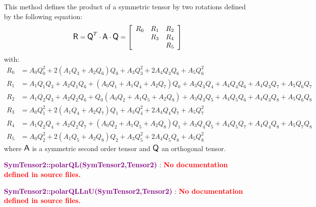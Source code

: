 This method defines the product of a symmetric tensor by two rotations defined by the following equation:
\begin{equation*}
\mbox{\large\ensuremath{\mathsf{R}}} = \mbox{\large\ensuremath{\mathsf{Q}}}^T \cdot \mbox{\large\ensuremath{\mathsf{A}}} \cdot \mbox{\large\ensuremath{\mathsf{Q}}} =\left[\begin{array}{ccc}
R_0&R_1&R_2\\
&R_3&R_4\\
&&R_5
\end{array}\right]
\end{equation*}
with:
\begin{align*}
R_0 &= A_0 Q_0^2 + 2 (A_1 Q_3 + A_2 Q_6) Q_0 + A_3 Q_3^2 + 2 A_4 Q_3 Q_6 + A_5 Q_6^2 \\
R_1 &= A_1 Q_1 Q_3 +A_2 Q_1 Q_6 + (A_0 Q_1 + A_1 Q_4 + A_2 Q_7) Q_0+ A_3 Q_3 Q_4 + A_4 Q_4 Q_6 + A_4 Q_3 Q_7 + A_5 Q_6 Q_7\\
R_2 &= A_1 Q_2 Q_3 + A_2 Q_2 Q_6 + Q_0 (A_0 Q_2 + A_1 Q_5 + A_2 Q_8) + A_3 Q_3 Q_5 + A_4 Q_5 Q_6 + A_4 Q_3 Q_8 + A_5 Q_6 Q_8\\
R_3 &= A_0 Q_1^2 + 2 (A_1 Q_4 + A_2 Q_7)Q_1 + A_3 Q_4^2 + 2 A_4 Q_4 Q_7 + A_5 Q_7^2\\
R_4 &= A_1 Q_2 Q_4 + A_2 Q_2 Q_7 + (A_0 Q_2 + A_1 Q_5 + A_2 Q_8)Q_1 + A_3 Q_4 Q_5 + A_4 Q_5 Q_7 + A_4 Q_4 Q_8 + A_5 Q_7 Q_8\\
R_5 &= A_0 Q_2^2 + 2 (A_1 Q_5 + A_2 Q_8) Q_2 + A_3 Q_5^2 + 2 A_4 Q_5 Q_8 + A_5 Q_8^2
\end{align*}
where $\mbox{\large\ensuremath{\mathsf{A}}}$ is a symmetric second order tensor and $\mbox{\large\ensuremath{\mathsf{Q}}}$ an orthogonal tensor.

\textcolor{purple}{\textbf{SymTensor2::polarQL(SymTensor2,Tensor2)}}\label{SymTensor2::polarQL(SymTensor2,Tensor2)} : \textcolor{red}{\textbf{No documentation defined in source files.}}


\textcolor{purple}{\textbf{SymTensor2::polarQLLnU(SymTensor2,Tensor2)}}\label{SymTensor2::polarQLLnU(SymTensor2,Tensor2)} : \textcolor{red}{\textbf{No documentation defined in source files.}}


